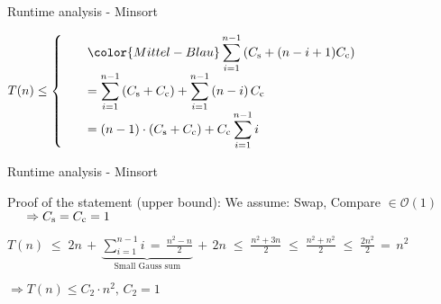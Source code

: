 
\begin{frame}{Runtime analysis - Minsort}
  \begin{center}
    \begin{math}
      T(n) \leq
      \left\lbrace
      \begin{array}{l}
      \displaystyle\hspace*{1.5em}\color{Mittel-Blau}
        \sum^{n - 1}_{i = 1} \left(C_\text{s} + (n - i + 1) C_\text{c}\right)\\
      \displaystyle\hspace*{1.5em}
        = \sum^{n - 1}_{i = 1} \left(C_\text{s} + C_\text{c}\right)
        + \sum^{n - 1}_{i = 1} \left(n - i\right) C_\text{c}\\
      \displaystyle\hspace{1.5em}
        = \left(n - 1\right) \cdot \left(C_\text{s} + C_\text{c}\right)
        + C_\text{c} \sum_{i = 1}^{n - 1} i\\
      \end{array}
      \right.
    \end{math}
  \end{center}
\end{frame}


\begin{frame}{Runtime analysis - Minsort}
  \begin{block}{Proof of the statement ({\color{Mittel-Gruen}upper bound}):}
    We assume: Swap, Compare $\in \mathcal{O}(1)$\\
    $\hspace{1.5em}\Rightarrow C_\text{s} = C_\text{c} = 1$
    \vspace*{0.5em}
    \begin{center}
      $\displaystyle
      T(n)
      \;\leq\;
        2 n \, + \, \underbrace{
          \sum \limits^{n - 1}_{i = 1} i
          \,=\, \frac{n^2 - n}{2}
        }_\text{Small Gauss sum}
        \, + \,2  n
      \;\leq\; \frac{n^2 + 3 n}{2}
      \;\leq\; \frac{n^2 + n^2}{2}
      \;\leq\; \frac{2 n^2}{2}
      \,=\, n^2
      $
    \end{center}
    $\Rightarrow T(n) \leq C_2 \cdot n^2, \, C_2 = 1$
  \end{block}
\end{frame}

